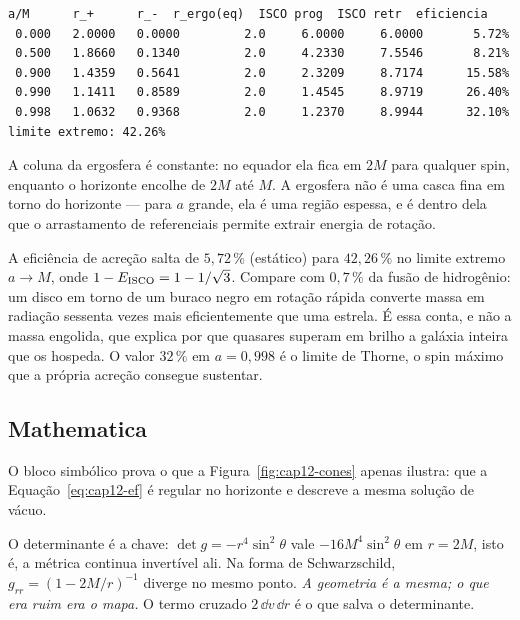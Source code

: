 \begin{saida}
\begin{lstlisting}[style=rgsaida]
   a/M      r_+      r_-  r_ergo(eq)  ISCO prog  ISCO retr  eficiencia
 0.000   2.0000   0.0000         2.0     6.0000     6.0000       5.72%
 0.500   1.8660   0.1340         2.0     4.2330     7.5546       8.21%
 0.900   1.4359   0.5641         2.0     2.3209     8.7174      15.58%
 0.990   1.1411   0.8589         2.0     1.4545     8.9719      26.40%
 0.998   1.0632   0.9368         2.0     1.2370     8.9944      32.10%
limite extremo: 42.26%
\end{lstlisting}
\end{saida}

A coluna da ergosfera é constante: no equador ela fica em $2M$ para qualquer
spin, enquanto o horizonte encolhe de $2M$ até $M$. A ergosfera não é uma
casca fina em torno do horizonte --- para $a$ grande, ela é uma região
espessa, e é dentro dela que o arrastamento de referenciais permite extrair
energia de rotação.

\begin{central}
A eficiência de acreção salta de $5{,}72\,\%$ (estático) para $42{,}26\,\%$
no limite extremo $a\to M$, onde $1-E_{\rm ISCO} = 1-1/\sqrt3$. Compare com
$0{,}7\,\%$ da fusão de hidrogênio: um disco em torno de um buraco negro em
rotação rápida converte massa em radiação sessenta vezes mais eficientemente
que uma estrela. É essa conta, e não a massa engolida, que explica por que
quasares superam em brilho a galáxia inteira que os hospeda. O valor
$32\,\%$ em $a=0{,}998$ é o limite de Thorne, o spin máximo que a própria
acreção consegue sustentar.
\end{central}

\subsection{Mathematica}


O bloco simbólico prova o que a Figura~\ref{fig:cap12-cones} apenas ilustra:
que a Equação~\eqref{eq:cap12-ef} é regular no horizonte e descreve a mesma
solução de vácuo.

O determinante é a chave: $\det g = -r^{4}\sin^{2}\theta$ vale
$-16M^{4}\sin^{2}\theta$ em $r=2M$, isto é, a métrica continua invertível
ali. Na forma de Schwarzschild, $g_{rr}=(1-2M/r)^{-1}$ diverge no mesmo
ponto. \emph{A geometria é a mesma; o que era ruim era o mapa.} O termo
cruzado $2\,\dd v\,\dd r$ é o que salva o determinante.

